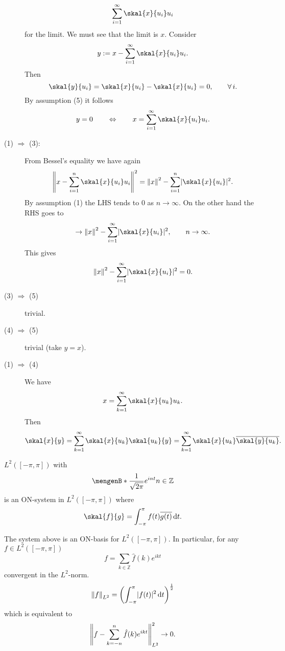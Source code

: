 \begin{beweis}
\begin{description}
		\[
			\sum_{i=1}^{\infty} \skal{x}{u_i}u_i 
		\]
		for the limit. We must see that the limit is $x$. Consider
		\[
			y := x - \sum_{i=1}^{\infty} \skal{x}{u_i}u_i.
		\]
		Then 
		\[
			\skal{y}{u_i} = \skal{x}{u_i} - \skal{x}{u_i} = 0, \qquad \forall\, i.
		\]
		By assumption (5) it follows 
		\[
			y = 0 \qquad \Leftrightarrow \qquad x = \sum^{\infty}_{i=1} \skal{x}{u_i}u_i.
		\]
		\item[(1) $\Rightarrow$ (3):] From Bessel's equality we have again
		\[
			\norm{x- \sum^{n}_{i=1}\skal{x}{u_i}u_i}^2 = \norm{x}^2 - \sum^{n}_{i=1}\abs{\skal{x}{u_i}}^2.
		\] 
		By assumption (1) the LHS tends to $0$ as $n \to \infty$. On the other hand the RHS goes to 
		\[
			\to \norm{x}^2 - \sum^{\infty}_{i=1} \abs{\skal{x}{u_i}}^2, \qquad n \to \infty.
		\]
		This gives 
		\[
			\norm{x}^2 - \sum_{i=1}^{\infty} \abs{\skal{x}{u_i}}^2 = 0.
		\]
		\item[(3) $\Rightarrow $ (5)] trivial.
		\item[(4) $\Rightarrow $ (5)] trivial (take $y=x$).
		\item[(1) $\Rightarrow $ (4)] We have
		\[
			x = \sum_{k=1}^{\infty} \skal{x}{u_k}u_k.
		\]
		Then
		\[
			\skal{x}{y} = \sum_{k=1}^{\infty} \skal{x}{u_k}\skal{u_k}{y} = \sum_{k=1}^{\infty}\skal{x}{u_k}\overline{\skal{y}{u_k}}.
		\]
 	\end{description}
\end{beweis}

\begin{beispiel}
	$L^2([- \pi, \pi])$ with
	\[
		\set[\frac{1}{\sqrt{2\pi}}e ^{int}]{n \in \mathbb{Z}}
	\]
	is an ON-system in $L^2([-\pi, \pi])$ where
	\[
		\skal{f}{g} = \int_{-\pi}^{\pi} f(t) \overline{g(t)} \,\mathrm{d}t.
	\]
\end{beispiel}

\begin{satz}
	The system above is an ON-basis for $L^2([-\pi,\pi])$. In particular, for any $f \in L^2([-\pi,\pi])$
	\[
		f = \sum_{k \in \mathbb{Z}}^{} \hat f(k) e^{ikt}
	\]
	convergent in the $L^2$-norm.
	\[
		\norm{f}_{L^2} = \left( \int_{-\pi}^{\pi} \abs{f(t)}^2 \,\mathrm{d}t \right)^{\frac{1}{2}}
	\]
	which is equivalent to
	\[
		\norm{f - \sum_{k=-n}^{n} \hat f(k) e^{ikt}}^2_{L^2} \to 0.
	\]
\end{satz}


